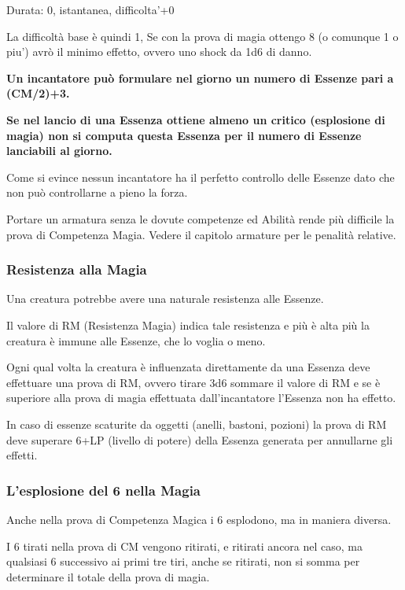 \documentclass[a4paper,11pt,twoside,openany]{book}
\begin{document}
Durata: 0, istantanea, difficolta'+0

La difficoltà base è quindi 1, Se con la prova di magia ottengo 8 (o comunque 1 o piu') avrò il minimo effetto, ovvero uno shock da 1d6 di danno.

\bigskip

\textbf{Un incantatore può formulare nel giorno un numero di Essenze pari a (CM/2)+3.} 

\textbf{Se nel lancio di una Essenza ottiene almeno un critico (esplosione di magia) non si computa questa Essenza per il numero di Essenze lanciabili al giorno.}

Come si evince nessun incantatore ha il perfetto controllo delle Essenze dato che non può controllarne a pieno la forza.

Portare un armatura senza le dovute competenze ed Abilità rende più difficile la prova di Competenza Magia. Vedere il capitolo armature per le penalità relative.

\subsubsection{Resistenza alla Magia}

Una creatura potrebbe avere una naturale resistenza alle Essenze.

Il valore di RM (Resistenza Magia) indica tale resistenza e più è alta più la creatura è immune alle Essenze, che lo voglia o meno.

Ogni qual volta la creatura è influenzata direttamente da una Essenza deve effettuare una prova di RM, ovvero tirare 3d6 sommare il valore di RM e se è superiore alla prova di magia effettuata dall'incantatore l'Essenza non ha effetto.

In caso di essenze scaturite da oggetti (anelli, bastoni, pozioni) la prova di RM deve superare 6+LP (livello di potere) della Essenza generata per annullarne gli effetti.

\subsubsection{L'esplosione del 6 nella Magia}

\label{lesplosione-del-6-nella-magia}

Anche nella prova di Competenza Magica i 6 esplodono, ma in maniera diversa.

I 6 tirati nella prova di CM vengono ritirati, e ritirati ancora nel caso, ma qualsiasi 6 successivo ai primi tre tiri, anche se ritirati, non si somma per determinare il totale della prova di magia.
\end{document}
